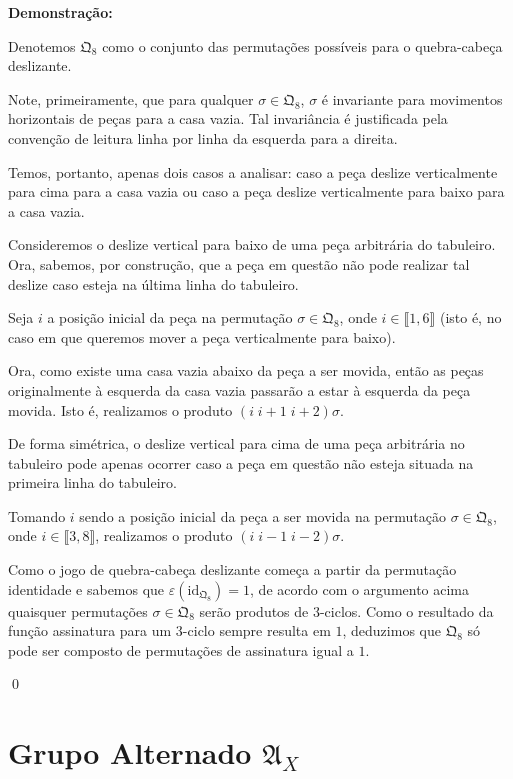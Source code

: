 \documentclass[16pt,openany]{book}
\theoremstyle{definition}
\begin{document}
\textbf{Demonstração:}

Denotemos $\mathfrak{Q}_{8}$ como o conjunto das permutações possíveis para o quebra-cabeça deslizante.

Note, primeiramente, que para qualquer $\sigma\in\mathfrak{Q}_8$, $\sigma$ é invariante para movimentos horizontais de peças para a casa vazia. Tal invariância é justificada pela convenção de leitura linha por linha da esquerda para a direita.

Temos, portanto, apenas dois casos a analisar: caso a peça deslize verticalmente para cima para a casa vazia ou caso a peça deslize verticalmente para baixo para a casa vazia.

Consideremos o deslize vertical para baixo de uma peça arbitrária do tabuleiro. Ora, sabemos, por construção, que a peça em questão não pode realizar tal deslize caso esteja na última linha do tabuleiro. 

Seja $i$ a posição inicial da peça na permutação $\sigma\in\mathfrak{Q}_8$, onde $i\in\llbracket 1,6\rrbracket$ (isto é, no caso em que queremos mover a peça verticalmente para baixo).

Ora, como existe uma casa vazia abaixo da peça a ser movida, então as peças originalmente à esquerda da casa vazia passarão a estar à esquerda da peça movida. Isto é, realizamos o produto $(i\;i+1\;i+2)\sigma$. 

De forma simétrica, o deslize vertical para cima de uma peça arbitrária no tabuleiro pode apenas ocorrer caso a peça em questão não esteja situada na primeira linha do tabuleiro.

Tomando $i$ sendo a posição inicial da peça a ser movida na permutação $\sigma\in\mathfrak{Q}_8$, onde $i\in\llbracket 3, 8\rrbracket$, realizamos o produto $(i\;i-1\;i-2)\sigma$.

Como o jogo de quebra-cabeça deslizante começa a partir da permutação identidade e sabemos que $\varepsilon(\text{id}_{\mathfrak{Q}_8}) = 1$, de acordo com o argumento acima quaisquer permutações $\sigma\in\mathfrak{Q}_8$ serão produtos de $3$-ciclos. Como o resultado da função assinatura para um $3$-ciclo sempre resulta em $1$, deduzimos que $\mathfrak{Q}_8$ só pode ser composto de permutações de assinatura igual a $1$. 

\qed

\section{Grupo Alternado $\mathfrak{A}_X$}
\end{document}
